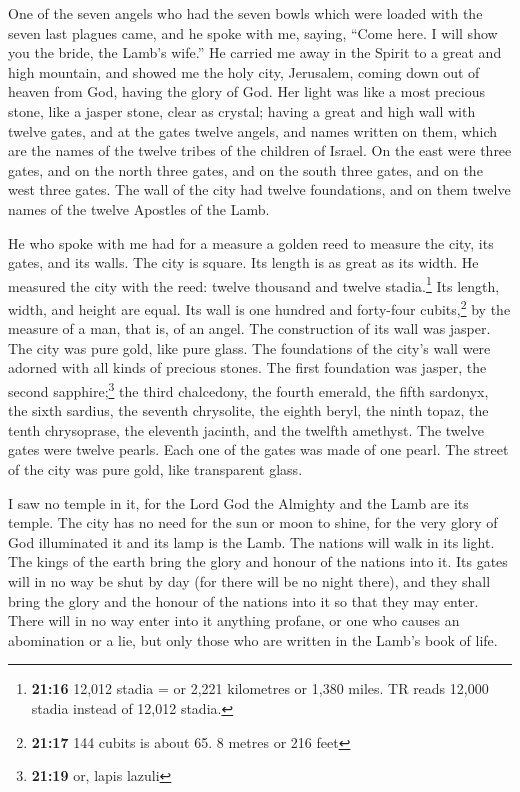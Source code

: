  One of the seven angels who had the seven bowls which
were loaded with the seven last plagues came, and he spoke with me,
saying, ``Come here. I will show you the bride, the Lamb's wife.''
 He carried me away in the Spirit to a great and high
mountain, and showed me the holy city, Jerusalem, coming down out of
heaven from God,  having the glory of God. Her light was
like a most precious stone, like a jasper stone, clear as crystal;
 having a great and high wall with twelve gates, and at
the gates twelve angels, and names written on them, which are the names
of the twelve tribes of the children of Israel.  On the
east were three gates, and on the north three gates, and on the south
three gates, and on the west three gates.  The wall of
the city had twelve foundations, and on them twelve names of the twelve
Apostles of the Lamb.

 He who spoke with me had for a measure a golden reed to
measure the city, its gates, and its walls.  The city is
square. Its length is as great as its width. He measured the city with
the reed: twelve thousand and twelve stadia.\footnote{\textbf{21:16}
  12,012 stadia = or 2,221 kilometres or 1,380 miles. TR reads 12,000
  stadia instead of 12,012 stadia.} Its length, width, and height are
equal.  Its wall is one hundred and forty-four
cubits,\footnote{\textbf{21:17} 144 cubits is about 65. 8 metres or 216
  feet} by the measure of a man, that is, of an angel. 
The construction of its wall was jasper. The city was pure gold, like
pure glass.  The foundations of the city's wall were
adorned with all kinds of precious stones. The first foundation was
jasper, the second sapphire;\footnote{\textbf{21:19} or, lapis lazuli}
the third chalcedony, the fourth emerald,  the fifth
sardonyx, the sixth sardius, the seventh chrysolite, the eighth beryl,
the ninth topaz, the tenth chrysoprase, the eleventh jacinth, and the
twelfth amethyst.  The twelve gates were twelve pearls.
Each one of the gates was made of one pearl. The street of the city was
pure gold, like transparent glass.

 I saw no temple in it, for the Lord God the Almighty and
the Lamb are its temple.  The city has no need for the
sun or moon to shine, for the very glory of God illuminated it and its
lamp is the Lamb.  The nations will walk in its light.
The kings of the earth bring the glory and honour of the nations into
it.  Its gates will in no way be shut by day (for there
will be no night there),  and they shall bring the glory
and the honour of the nations into it so that they may enter.
 There will in no way enter into it anything profane, or
one who causes an abomination or a lie, but only those who are written
in the Lamb's book of life.

